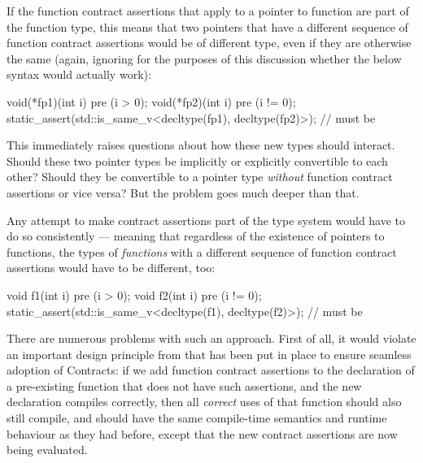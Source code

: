 If the function contract assertions that apply to a pointer to function are part of the function type, this means that two pointers that have a different sequence of function contract assertions would be of different type, even if they are otherwise the same (again, ignoring for the purposes of this discussion whether the below syntax would actually work):
\begin{codeblock}
void(*fp1)(int i) pre (i > 0);
void(*fp2)(int i) pre (i != 0);
static_assert(std::is_same_v<decltype(fp1), decltype(fp2)>);  // must be 
\end{codeblock}
This immediately raises questions about how these new types should interact. Should these two pointer types be implicitly or explicitly convertible to each other? Should they be convertible to a pointer type \emph{without} function contract assertions or vice versa? But the problem goes much deeper than that.

Any attempt to make contract assertions part of the type system would have to do so consistently --- meaning that regardless of the existence of pointers to functions, the types of \emph{functions} with a different sequence of function contract assertions would have to be different, too:

\pagebreak %

\begin{codeblock}
void f1(int i) pre (i > 0);
void f2(int i) pre (i != 0);
static_assert(std::is_same_v<decltype(f1), decltype(f2)>);  // must be 
\end{codeblock}
There are numerous problems with such an approach. First of all, it would violate an important design principle from \cite{P2900R7} that has been put in place to ensure seamless adoption of Contracts: if we add function contract assertions to the declaration of a pre-existing function that does not have such assertions, and the new declaration compiles correctly, then all \emph{correct} uses of that function should also still compile, and should have the same compile-time semantics and runtime behaviour as they had before, except that the new contract assertions are now being evaluated.

